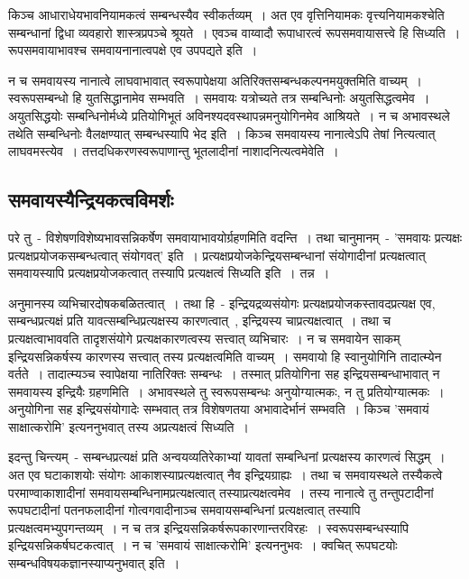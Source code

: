 		किञ्च आधाराधेयभावनियामकत्वं सम्बन्धस्यैव स्वीकर्तव्यम्~। अत एव वृत्तिनियामकः वृत्त्यनियामकश्चेति सम्बन्धानां द्विधा व्यवहारो शास्त्रप्रपञ्चे श्रूयते~। एवञ्च वाय्वादौ रूपाधारत्वं रूपसमवायासत्त्वे हि सिध्यति~। रूपसमवायाभावश्च समवायनानात्वपक्षे एव उपपद्यते इति~।

		न च समवायस्य नानात्वे लाघवाभावात् स्वरूपापेक्षया अतिरिक्तसम्बन्धकल्पनमयुक्तमिति वाच्यम्~। स्वरूपसम्बन्धो हि युतसिद्धानामेव सम्भवति~। समवायः यत्रोच्यते तत्र सम्बन्धिनोः अयुतसिद्धत्वमेव~। अयुतसिद्धयोः सम्बन्धिनोर्मध्ये प्रतियोगिभूतं अविनश्यदवस्थापन्नमनुयोगिनमेव आश्रियते~। न च अभावस्थले तथेति सम्बन्धिनोः वैलक्षण्यात् सम्बन्धस्यापि भेद इति~। किञ्च समवायस्य नानात्वेऽपि तेषां नित्यत्वात् लाघवमस्त्येव~। तत्तदधिकरणस्वरूपाणान्तु भूतलादीनां नाशादनित्यत्वमेवेति~।
		
		\subsection{समवायस्यैन्द्रियकत्वविमर्शः}

		परे तु~- विशेषणविशेष्यभावसन्निकर्षेण समवायाभावयोर्ग्रहणमिति वदन्ति~। तथा चानुमानम्~- 'समवायः प्रत्यक्षः प्रत्यक्षप्रयोजकसम्बन्धत्वात् संयोगवत्' इति~। प्रत्यक्षप्रयोजकेन्द्रियसम्बन्धानां संयोगादीनां प्रत्यक्षत्वात् समवायस्यापि प्रत्यक्षप्रयोजकत्वात् तस्यापि प्रत्यक्षत्वं सिध्यति इति~। तन्न~। 

		अनुमानस्य व्यभिचारदोषकबळितत्वात्~। तथा हि~- इन्द्रियद्रव्यसंयोगः प्रत्यक्षप्रयोजकस्तावदप्रत्यक्ष एव, सम्बन्धप्रत्यक्षं प्रति यावत्सम्बन्धिप्रत्यक्षस्य कारणत्वात्~, इन्द्रियस्य चाप्रत्यक्षत्वात्~। तथा च प्रत्यक्षत्वाभाववति तादृशसंयोगे प्रत्यक्षकारणत्वस्य सत्त्वात् व्यभिचारः~। न च समवायेन साकम् इन्द्रियसन्निकर्षस्य कारणस्य सत्त्वात् तस्य प्रत्यक्षत्वमिति वाच्यम्~। समवायो हि स्वानुयोगिनि तादात्म्येन वर्तते~। तादात्म्यञ्च स्वापेक्षया नातिरिक्तः सम्बन्धः~। तस्मात् प्रतियोगिना सह इन्द्रियसम्बन्धाभावात् न समवायस्य इन्द्रियैः ग्रहणमिति~। अभावस्थले तु  स्वरूपसम्बन्धः अनुयोग्यात्मकः, न तु प्रतियोग्यात्मकः~। अनुयोगिना सह इन्द्रियसंयोगादेः सम्भवात् तत्र विशेषणतया अभावादेर्भानं सम्भवति~। किञ्च 'समवायं साक्षात्करोमि' इत्यननुभवात् तस्य अप्रत्यक्षत्वं सिध्यति~।

		इदन्तु चिन्त्यम्~- सम्बन्धप्रत्यक्षं प्रति अन्वयव्यतिरेकाभ्यां यावतां सम्बन्धिनां प्रत्यक्षस्य कारणत्वं सिद्धम्~। अत एव घटाकाशयोः संयोगः आकाशस्याप्रत्यक्षत्वात् नैव इन्द्रियग्राह्यः~। तथा च समवायस्थले तस्यैकत्वे परमाण्वाकाशादीनां समवायसम्बन्धिनामप्रत्यक्षत्वात् तस्याप्रत्यक्षत्वमेव~। तस्य नानात्वे तु तन्तुपटादीनां रूपघटादीनां पतनफलादीनां गोत्वगवादीनाञ्च समवायसम्बन्धिनां प्रत्यक्षत्वात् तस्यापि प्रत्यक्षत्वमभ्युपगन्तव्यम्~। न च तत्र इन्द्रियसन्निकर्षरूपकारणान्तरविरहः~। स्वरूपसम्बन्धस्यापि इन्द्रियसन्निकर्षघटकत्वात्~। न च 'समवायं साक्षात्करोमि' इत्यननुभवः~। क्वचित् रूपघटयोः सम्बन्धविषयकज्ञानस्याप्यनुभवात् इति~।

